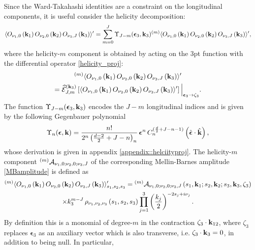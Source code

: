 \documentclass[11pt,a4paper]{article}
\begin{document}
Since the Ward-Takahashi identities are a constraint on the longitudinal components, it is useful consider the helicity decomposition:
\begin{equation}\nonumber
    \langle O_{\nu_1,0}\left({\bf k}_1\right)O_{\nu_2,0}\left({\bf k}_2\right)O_{\nu_3,J}\left({\bf k}_3\right)  \rangle^\prime =\sum^J_{m=0}\Upsilon_{J-m}(\boldsymbol{\epsilon}_3,{\bf k}_3){}^{\left(m\right)}\langle O_{\nu_1,0}\left({\bf k}_1\right)O_{\nu_2,0}\left({\bf k}_2\right)O_{\nu_3,J}\left({\bf k}_3\right)  \rangle^\prime,
\end{equation}
where the helicity-$m$ component is obtained by acting on the 3pt function with the differential operator \eqref{helicity_proj}:
\begin{multline}
  {}^{\left(m\right)}\langle O_{\nu_1,0}\left({\bf k}_1\right)O_{\nu_2,0}\left({\bf k}_2\right)O_{\nu_3,J}\left({\bf k}_3\right)  \rangle^\prime \\ = \widehat{\mathcal{E}}_{J,m}^{\left({\bf k}_3\right)}\left[\langle O_{\nu_1,0}\left({\bf k}_1\right)O_{\nu_2,0}\left({\bf k}_2\right)O_{\nu_3,J}\left({\bf k}_3\right)  \rangle^\prime\right]\Big|_{\boldsymbol{\epsilon}_3 \to \zeta_3}.
\end{multline}
The function $\Upsilon_{J-m}(\boldsymbol{\epsilon}_3,{\bf k}_3)$ encodes the $J-m$ longitudinal indices and is given by the following Gegenbauer polynomial
\begin{equation}
    {\Upsilon}_{n}(\boldsymbol{\epsilon},{\bf k})=\frac{n!}{2^{n}\left(\frac{d-2}{2}+J-n\right)_n}\,\boldsymbol{\epsilon}^n\,C_{n}^{(\frac{d}{2}+J-n-1)}\left(\hat{\boldsymbol{\epsilon}}\cdot\hat{{}\bf k}\right),
\end{equation}
whose derivation is given in appendix \ref{appendix::helciityproj}. The helicity-$m$ component ${}^{\left(m\right)}{\cal A}_{\nu_1,0;\nu_2,0;\nu_3,J}$ of the corresponding Mellin-Barnes amplitude \eqref{MBamplitude} is defined as
\begin{multline}\label{helicitymcorr}
    {}^{\left(m\right)}\langle O_{\nu_1,0}\left({\bf k}_1\right)O_{\nu_2,0}\left({\bf k}_2\right)O_{\nu_3,J}\left({\bf k}_3\right)  \rangle^\prime_{s_1,s_2,s_3} =   {}^{\left(m\right)}{\cal A}_{\nu_1,0;\nu_2,0;\nu_3,J}\left(s_1,{\bf k}_1;s_2,{\bf k}_2;s_3,{\bf k}_3,\zeta_3\right)\\ \times k^{m-J}_3\,\rho_{\nu_1,\nu_2,\nu_3}\left(s_1,s_2,s_3\right)\prod^3_{j=1}\left(\frac{k_j}{2}\right)^{-2s_j+i\nu_j}.
\end{multline}
By definition this is a monomial of degree-$m$ in the contraction $\zeta_3 \cdot {\bf k}_{12}$, where $\zeta_3$ replaces $\boldsymbol{\epsilon}_3$ as an auxiliary vector which is also transverse, i.e. $\zeta_3 \cdot {\bf k}_3=0$, in addition to being null. In particular,
\end{document}
